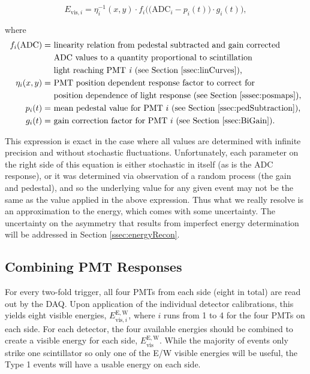 \begin{equation} \label{eq:EvisResponse}
E_{\mathrm{vis},i} = \eta_i^{-1}(x,y) \cdot f_i\bigg( \Big( \mathrm{ADC}_i - p_i(t) \Big) \cdot g_i(t) \bigg)  ,
\end{equation}

\noindent where 
\begin{align*}
  f_i(\mathrm{ADC}) = & \text{ linearity relation from pedestal subtracted and gain corrected} \\
  & \text{ ADC values to a quantity proportional to scintillation} \\
  & \text{ light reaching PMT \textit{i} (see Section \ref{ssec:linCurves}),}\\
  \eta_i(x,y) = &\text{ PMT position dependent response factor to correct for} \\
    & \text{ position dependence of light response (see Section \ref{sssec:posmaps}),} \\
  p_i(t) = &\text{ mean pedestal value for PMT } i \text{ (see Section \ref{ssec:pedSubtraction}),} \\
  g_i(t) = &\text{ gain correction factor for PMT }i \text{ (see Section \ref{ssec:BiGain})}.
\end{align*}

This expression is exact in the case where all values are determined with infinite
precision and without stochastic fluctuations. Unfortunately, each parameter on the right
side of this equation is either stochastic in itself (as is the ADC response), or it was
determined via observation of a random process (the gain and pedestal), and so
the underlying value for any given event may not be the same as the value applied in the
above expression. Thus what we
really resolve is an approximation to the energy, which comes with some uncertainty. The uncertainty
on the asymmetry that results from imperfect energy determination
will be addressed in Section \ref{ssec:energyRecon}.


\subsection{Combining PMT Responses} \label{ssec:combinePMT}

For every two-fold trigger, all four PMTs from each side (eight in total) are read out by the
DAQ. Upon application of the individual detector calibrations, this yields
eight visible energies, $E_{\mathrm{vis},i}^\mathrm{E,W}$, where $i$ runs from 1 to 4 for the
four PMTs on each side. For each detector, the four available energies should
be combined to create a visible energy for each side, $E_{\mathrm{vis}}^\mathrm{E,W}$. While the
majority of events only strike one scintillator so only one of the E/W visible energies will
be useful, the Type 1 events will have a usable energy on each side.

